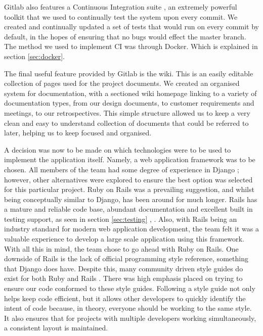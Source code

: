 \documentclass{l3proj}
\begin{document}
Gitlab also features a Continuous Integration suite \cite{ci}, an extremely powerful toolkit that we used to continually test the system upon every commit. We created and continually updated a set of tests that would run on every commit by default, in the hopes of ensuring that no bugs would effect the master branch. The method we used to implement CI was through Docker. Which is explained in section \ref{sec:docker}.

The final useful feature provided by Gitlab is the wiki. This is an easily editable collection of pages used for the project documents. We created an organised system for documentation, with a sectioned wiki homepage linking to a variety of documentation types, from our design documents, to customer requirements and meetings, to our retrospectives. This simple structure allowed us to keep a very clean and easy to understand collection of documents that could be referred to later, helping us to keep focused and organised.

A decision was now to be made on which technologies were to be used to implement the application itself. Namely, a web application framework was to be chosen. All members of the team had some degree of experience in Django \cite{Django}; however, other alternatives were explored to ensure the best option was selected for this particular project. Ruby on Rails was a prevailing suggestion, and whilst being conceptually similar to Django, has been around for much longer. Rails has a mature and reliable code base, abundant documentation and excellent built in testing support, as seen in section \ref{sec:testing} \cite{Rails}, \cite{DjangoVsRails}. Also, with Rails being an industry standard for modern web application development, the team felt it was a valuable experience to develop a large scale application using this framework. With all this in mind, the team chose to go ahead with Ruby on Rails. One downside of Rails is the lack of official programming style reference, something that Django does have. Despite this, many community driven style guides do exist for both Ruby \cite{rubyStyle} and Rails \cite{railsStyle}. There was high emphasis placed on trying to ensure our code conformed to these style guides. Following a style guide not only helps keep code efficient, but it allows other developers to quickly identify the intent of code because, in theory, everyone should be working to the same style. It also ensures that for projects with multiple developers working simultaneously, a consistent layout is maintained.
\end{document}
